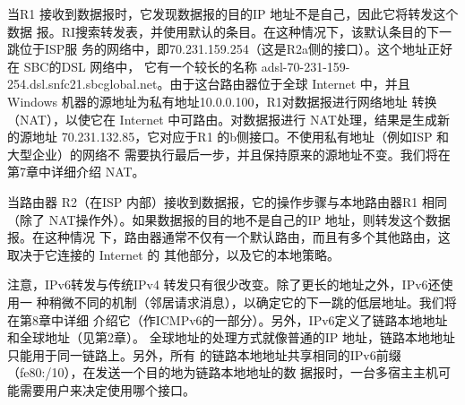 当R1 接收到数据报时，它发现数据报的目的IP 地址不是自己，因此它将转发这个数据
报。RI搜索转发表，并使用默认的条目。在这种情况下，该默认条目的下一跳位于ISP服
务的网络中，即70.231.159.254（这是R2a侧的接口）。这个地址正好在 SBC的DSL 网络中，
它有一个较长的名称 adsl-70-231-159-254.dsl.snfc21.sbcglobal.net。由于这台路由器位于全球
Internet 中，并且 Windows 机器的源地址为私有地址10.0.0.100，R1对数据报进行网络地址
转换（NAT），以使它在 Internet 中可路由。对数据报进行 NAT处理，结果是生成新的源地址
70.231.132.85，它对应于R1 的b侧接口。不使用私有地址（例如ISP 和大型企业）的网络不
需要执行最后一步，并且保持原来的源地址不变。我们将在第7章中详细介绍 NAT。

当路由器 R2（在ISP 内部）接收到数据报，它的操作步骤与本地路由器R1 相同（除了
NAT操作外）。如果数据报的目的地不是自己的IP 地址，则转发这个数据报。在这种情况
下，路由器通常不仅有一个默认路由，而且有多个其他路由，这取决于它连接的 Internet 的
其他部分，以及它的本地策略。

注意，IPv6转发与传统IPv4 转发只有很少改变。除了更长的地址之外，IPv6还使用一
种稍微不同的机制（邻居请求消息），以确定它的下一跳的低层地址。我们将在第8章中详细
介绍它（作ICMPv6的一部分）。另外，IPv6定义了链路本地地址和全球地址（见第2章）。
全球地址的处理方式就像普通的IP 地址，链路本地地址只能用于同一链路上。另外，所有
的链路本地地址共享相同的IPv6前缀（fe80:/10），在发送一个目的地为链路本地地址的数
据报时，一台多宿主主机可能需要用户来决定使用哪个接口。

